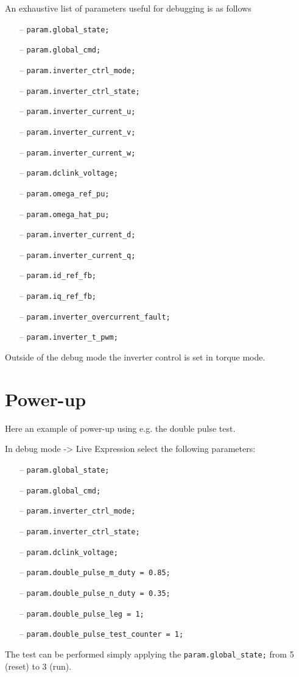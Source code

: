 \documentclass[11pt,a4paper,oneside]{book}
\numberwithin{equation}{section}
\theoremstyle{it}
\theoremstyle{definition}
\begin{document}
An exhaustive list of parameters useful for debugging is as follows 
\begin{itemize}
	\item[--] \texttt{param.global\_state;}   	
	\item[--] \texttt{param.global\_cmd;} 
	\item[--] \texttt{param.inverter\_ctrl\_mode;}
	\item[--] \texttt{param.inverter\_ctrl\_state;}
	\item[--] \texttt{param.inverter\_current\_u;}
	\item[--] \texttt{param.inverter\_current\_v;}
	\item[--] \texttt{param.inverter\_current\_w;}
	\item[--] \texttt{param.dclink\_voltage;}
	\item[--] \texttt{param.omega\_ref\_pu;}     
	\item[--] \texttt{param.omega\_hat\_pu;}    
	\item[--] \texttt{param.inverter\_current\_d;}
	\item[--] \texttt{param.inverter\_current\_q;} 
	\item[--] \texttt{param.id\_ref\_fb;}   	
	\item[--] \texttt{param.iq\_ref\_fb;} 
	\item[--] \texttt{param.inverter\_overcurrent\_fault;} 
	\item[--] \texttt{param.inverter\_t\_pwm;} 
\end{itemize}  


Outside of the debug mode the inverter control is set in torque mode.

\section{Power-up}	
Here an example of power-up using e.g. the double pulse test.

In debug mode -> Live Expression select the following parameters:
\begin{itemize}
	\item[--] \texttt{param.global\_state;}   	
	\item[--] \texttt{param.global\_cmd;} 
	\item[--] \texttt{param.inverter\_ctrl\_mode;}
	\item[--] \texttt{param.inverter\_ctrl\_state;}
	\item[--] \texttt{param.dclink\_voltage;}
	\item[--] \texttt{param.double\_pulse\_m\_duty = 0.85;}   	
	\item[--] \texttt{param.double\_pulse\_n\_duty = 0.35;}
	\item[--] \texttt{param.double\_pulse\_leg = 1;}
	\item[--] \texttt{param.double\_pulse\_test\_counter = 1;}
\end{itemize}  
The test can be performed simply applying the \texttt{param.global\_state;} from 5 (reset) to 3 (run).
\end{document}
